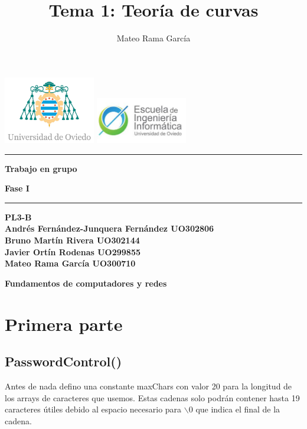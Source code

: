 \documentclass[11pt,a4paper]{article}
\title{\textbf{Tema 1: } Teoría de curvas}
\author{Mateo Rama García}
\begin{document}
  
\begin{titlepage}
  \centering  
  \vspace*{1cm}  %
  \includegraphics[width=0.3\textwidth]{uniovi.jpg} \hspace{2cm}
  \includegraphics[width=0.3\textwidth]{descarga.jpeg} \\[1cm] 
  \vspace{\fill}%
  \hrule
  \vspace{0.5cm}
  {\Huge \bfseries Trabajo en grupo\par}
  \vspace{0.5cm}
  {\Large \bfseries Fase I\par}
  \vspace{0.5cm}
  \hrule
  \vspace{1cm}
  {\bfseries PL3-B \\ [3ex]
  Andrés Fernández-Junquera Fernández UO302806\\[3ex]
  Bruno Martín Rivera UO302144\\[3ex]
  Javier Ortín Rodenas UO299855\\[3ex]
  Mateo Rama García UO300710\par} %
  \vspace{\fill}  %
  {\Large \textbf{Fundamentos de computadores y redes}\par}
\end{titlepage}



\newpage

\tableofcontents

\newpage


\section{Primera parte}
\subsection{PasswordControl()}
Antes de nada defino una constante maxChars con valor 20 para la longitud de los arrays de caracteres que usemos. Estas cadenas solo podrán contener hasta 19 caracteres útiles debido al espacio necesario para \(\backslash 0\) que indica el final de la cadena.
\end{document}

